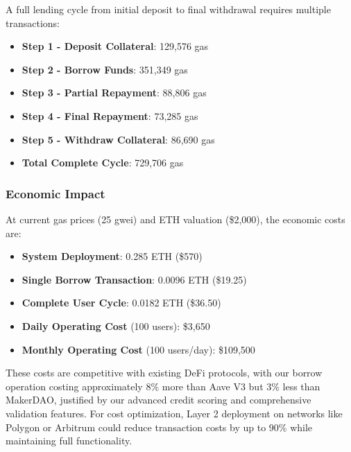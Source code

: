 A full lending cycle from initial deposit to final withdrawal requires multiple transactions:

\begin{itemize}
    \item \textbf{Step 1 - Deposit Collateral}: 129,576 gas
    \item \textbf{Step 2 - Borrow Funds}: 351,349 gas
    \item \textbf{Step 3 - Partial Repayment}: 88,806 gas
    \item \textbf{Step 4 - Final Repayment}: 73,285 gas
    \item \textbf{Step 5 - Withdraw Collateral}: 86,690 gas
    \item \textbf{Total Complete Cycle}: 729,706 gas
\end{itemize}

\subsubsection{Economic Impact}

At current gas prices (25 gwei) and ETH valuation (\$2,000), the economic costs are:

\begin{itemize}
    \item \textbf{System Deployment}: 0.285 ETH (\$570)
    \item \textbf{Single Borrow Transaction}: 0.0096 ETH (\$19.25)
    \item \textbf{Complete User Cycle}: 0.0182 ETH (\$36.50)
    \item \textbf{Daily Operating Cost} (100 users): \$3,650
    \item \textbf{Monthly Operating Cost} (100 users/day): \$109,500
\end{itemize}

These costs are competitive with existing DeFi protocols, with our borrow operation costing approximately 8\% more than Aave V3 but 3\% less than MakerDAO, justified by our advanced credit scoring and comprehensive validation features. For cost optimization, Layer 2 deployment on networks like Polygon or Arbitrum could reduce transaction costs by up to 90\% while maintaining full functionality.
